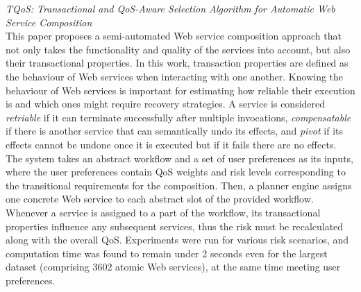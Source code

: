 \textit{TQoS: Transactional and QoS-Aware Selection Algorithm for Automatic Web Service Composition \cite{el2010tqos}}\\
This paper proposes a semi-automated Web service composition approach that not only takes the functionality and quality of the services into account, but also their
transactional properties. In this work, transaction properties are defined as the behaviour of Web services when interacting with one another. Knowing the behaviour
of Web services is important for estimating how reliable their execution is and which ones might require recovery strategies. A service is considered
\textit{retriable} if it can terminate successfully after multiple invocations, \textit{compensatable} if there is another service that can semantically undo its effects,
and \textit{pivot} if its effects cannot be undone once it is executed but if it fails there are no effects. The system takes an abstract workflow and a set of user
preferences as its inputs, where the user preferences contain QoS weights and risk levels corresponding to the transitional requirements for the composition. Then, a
planner engine assigns one concrete Web service to each abstract slot of the provided workflow. Whenever a service is assigned to a part of the workflow, its transactional
properties influence any subsequent services, thus the risk must be recalculated along with the overall QoS. Experiments were run for various risk scenarios, and computation
time was found to remain under 2 seconds even for the largest dataset (comprising 3602 atomic Web services), at the same time meeting user preferences.

